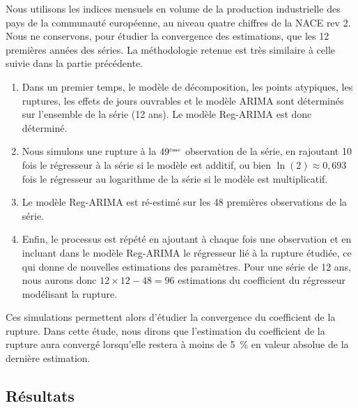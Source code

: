 \documentclass[12pt, a4paper, french]{article}
\begin{document}
Nous utilisons les indices mensuels en volume de la production industrielle des pays de la communauté européenne, au niveau quatre chiffres de la NACE rev 2. Nous ne conservons, pour étudier la convergence des estimations, que les 12 premières années des séries.
La méthodologie retenue est très similaire à celle suivie dans la partie précédente.
\begin{enumerate}
	\item Dans un premier temps, le modèle de décomposition, les points atypiques, les ruptures, les effets de jours ouvrables et le modèle ARIMA sont déterminés sur l'ensemble de la série (12 ans). Le modèle Reg-ARIMA est donc déterminé.
	\item Nous simulons une rupture à la $49^{\mbox{\tiny ème}}$ observation de la série, en rajoutant 10 fois le régresseur à la série si le modèle est additif, ou bien $\ln(2) \approx 0,693$ fois le régresseur au logarithme de la série si le modèle est multiplicatif.
	\item Le modèle Reg-ARIMA est ré-estimé sur les 48 premières observations de la série.
	\item Enfin, le processus est répété en ajoutant à chaque fois une observation et en incluant dans le modèle Reg-ARIMA le régresseur lié à la rupture étudiée, ce qui donne de nouvelles estimations des paramètres. Pour une série de 12 ans, nous aurons donc $12\times12 - 48 = 96$ estimations du coefficient du régresseur modélisant la rupture.
\end{enumerate}
Ces simulations permettent alors d'étudier la convergence du coefficient de la rupture. Dans cette étude, nous dirons que l'estimation du coefficient de la rupture aura convergé lorsqu'elle restera à moins de 5~\% en valeur absolue de la dernière estimation.

\subsection{Résultats}
\end{document}
